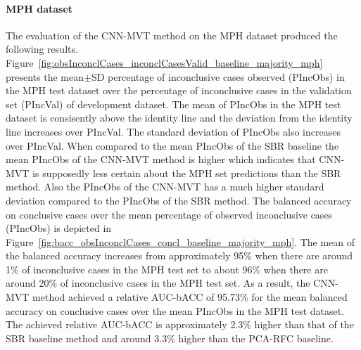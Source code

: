 
\paragraph{MPH dataset}

The evaluation of the CNN-MVT method on the MPH dataset produced the following results.
Figure~\ref{fig:obsInconclCases_inconclCasesValid_baseline_majority_mph} presents
the mean$\pm$SD percentage of inconclusive cases observed (PIncObs) in the MPH test dataset 
over the percentage of inconclusive cases in the validation set (PIncVal) of development dataset.
The mean of PIncObs in the MPH test dataset is consisently above the identity line 
and the deviation from the identity line increases over PIncVal.
The standard deviation of PIncObs also increases over PIncVal.
When compared to the mean PIncObs of the SBR baseline the mean PIncObs of the CNN-MVT method is higher 
which indicates that CNN-MVT is supposedly less certain about the MPH set predictions than the SBR method.
Also the PIncObs of the CNN-MVT has a much higher standard deviation compared to the PIncObs of the SBR method.
The balanced accuracy on conclusive cases over the mean percentage of observed inconclusive cases (PIncObs) is depicted 
in Figure~\ref{fig:bacc_obsInconclCases_concl_baseline_majority_mph}.
The mean of the balanced accuracy increases from approximately 95\% 
when there are around 1\% of inconclusive cases in the MPH test set to about 96\% 
when there are around 20\% of inconclusive cases in the MPH test set.
As a result, the CNN-MVT method achieved a relative AUC-bACC of 95.73\% for the mean balanced accuracy on conclusive cases 
over the mean PIncObs in the MPH test dataset.
The achieved relative AUC-bACC is approximately 2.3\% higher than that of the SBR baseline method 
and around 3.3\% higher than the PCA-RFC baseline.


